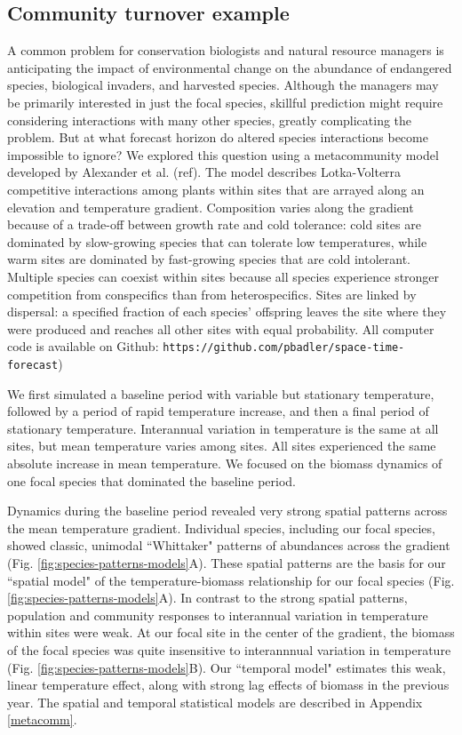 \documentclass[11pt]{article}
\begin{document}
\subsection*{Community turnover example}

A common problem for conservation biologists and natural resource managers is anticipating the impact of environmental change on the abundance of 
endangered species, biological invaders, and harvested species. Although the managers may be primarily interested in just the focal species, 
skillful prediction might require considering interactions with many other species, greatly complicating the problem. But at what forecast horizon do
altered species interactions become impossible to ignore? We explored this question using a metacommunity model developed by Alexander et al. (ref). 
The model describes Lotka-Volterra competitive interactions among plants within sites that are arrayed along an elevation and temperature gradient.
Composition varies along the gradient because of a trade-off between growth rate and cold tolerance: 
cold sites are dominated by slow-growing species that can tolerate low temperatures, while warm sites are dominated by 
fast-growing species that are cold intolerant. Multiple species can coexist within sites because all species experience stronger competition from conspecifics than from heterospecifics. 
Sites are linked by dispersal: a specified fraction of each species' offspring leaves the site where they were produced and reaches all other sites with equal probability. All computer code is available on Github: \texttt{https://github.com/pbadler/space-time-forecast})

We first simulated a baseline period with variable but stationary temperature, followed by a period of rapid temperature increase, and then a 
final period of stationary temperature. Interannual variation in temperature is the same at all sites, but mean temperature varies among sites. All sites experienced the 
same absolute increase in mean temperature. We focused on the biomass dynamics of one focal species that dominated the baseline period.

Dynamics during the baseline period revealed very strong spatial patterns across the mean temperature gradient. 
Individual species, including our focal species, showed classic, unimodal ``Whittaker" patterns of abundances across the gradient (Fig. \ref{fig:species-patterns-models}A).
These spatial patterns are the basis for our ``spatial model" of the temperature-biomass relationship for our focal species (Fig. \ref{fig:species-patterns-models}A). 
In contrast to the strong spatial patterns, population and community responses to interannual variation in temperature within sites were weak.
At our focal site in the center of the gradient, the biomass of the focal species was quite insensitive to interannnual variation in temperature (Fig. \ref{fig:species-patterns-models}B). Our ``temporal model" estimates this weak, linear temperature effect, along with strong lag effects of biomass in the previous year. The spatial and temporal statistical
models are described in Appendix \ref{metacomm}.
\end{document}
